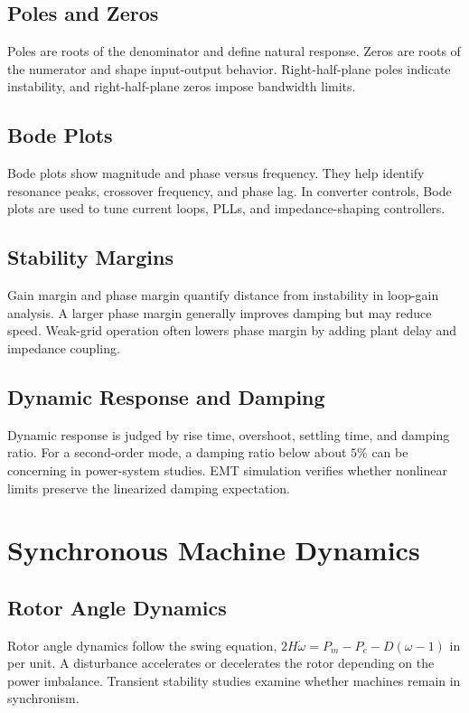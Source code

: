 \documentclass[11pt]{article}
\begin{document}
\subsection{Poles and Zeros}
Poles are roots of the denominator and define natural response. Zeros are roots of the numerator and shape input-output behavior. Right-half-plane poles indicate instability, and right-half-plane zeros impose bandwidth limits.

\subsection{Bode Plots}
Bode plots show magnitude and phase versus frequency. They help identify resonance peaks, crossover frequency, and phase lag. In converter controls, Bode plots are used to tune current loops, PLLs, and impedance-shaping controllers.

\subsection{Stability Margins}
Gain margin and phase margin quantify distance from instability in loop-gain analysis. A larger phase margin generally improves damping but may reduce speed. Weak-grid operation often lowers phase margin by adding plant delay and impedance coupling.

\subsection{Dynamic Response and Damping}
Dynamic response is judged by rise time, overshoot, settling time, and damping ratio. For a second-order mode, a damping ratio below about $5\%$ can be concerning in power-system studies. EMT simulation verifies whether nonlinear limits preserve the linearized damping expectation.

\section{Synchronous Machine Dynamics}
\subsection{Rotor Angle Dynamics}
Rotor angle dynamics follow the swing equation, $2H\dot{\omega}=P_m-P_e-D(\omega-1)$ in per unit. A disturbance accelerates or decelerates the rotor depending on the power imbalance. Transient stability studies examine whether machines remain in synchronism.
\end{document}
